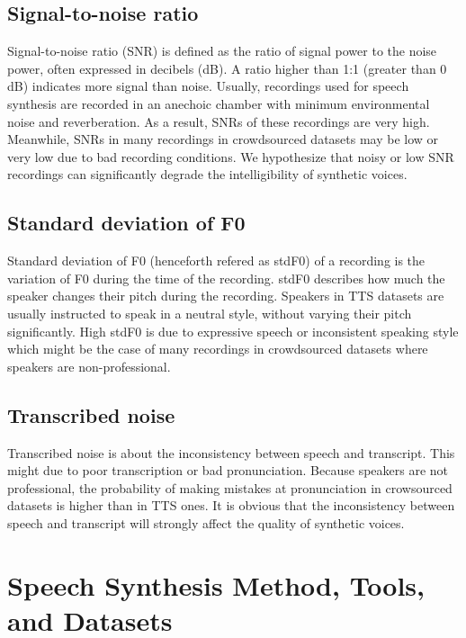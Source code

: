 \documentclass[12pt]{article}
\begin{document}
\subsection{Signal-to-noise ratio}
Signal-to-noise ratio (SNR) is defined as the ratio of signal power to the noise power, often expressed in decibels (dB). A ratio higher than 1:1 (greater than 0 dB) indicates more signal than noise. Usually, recordings used for speech synthesis are recorded in an anechoic chamber with minimum environmental noise and reverberation. As a result, SNRs of these recordings are very high.
Meanwhile, SNRs in many recordings in crowdsourced datasets may be low or very low due to bad recording conditions.
We hypothesize that noisy or low SNR recordings can significantly degrade the intelligibility of synthetic voices.

\subsection{Standard deviation of F0}
Standard deviation of F0 (henceforth refered as stdF0) of a recording is the variation of F0 during the time of the recording. stdF0 describes how much the speaker changes their pitch during the recording. Speakers in TTS datasets are usually instructed to speak in a neutral style, without varying their pitch significantly. High stdF0 is due to expressive speech or inconsistent speaking style which might be the case of many recordings in crowdsourced datasets where speakers are non-professional.

\subsection{Transcribed noise}
Transcribed noise is about the inconsistency between speech and transcript. This might due to poor transcription or bad pronunciation. Because speakers are not professional, the probability of making mistakes at pronunciation in crowsourced datasets is higher than in TTS ones. It is obvious that the inconsistency between speech and transcript will strongly affect the quality of synthetic voices.


\clearpage
\section{Speech Synthesis Method, Tools, and Datasets}\label{sec_methodToolsDatasets}
\end{document}
